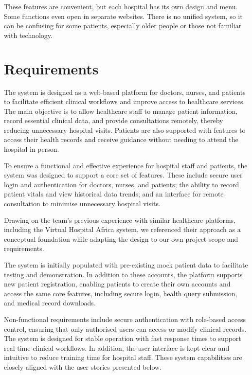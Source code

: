 These features are convenient, but each hospital has its own design and menu. Some functions even open in separate websites. There is no unified system, so it can be confusing for some patients, especially older people or those not familiar with technology.


\clearpage


\clearpage
\section{Requirements}
\label{sec:requirements}

The system is designed as a web-based platform for doctors, nurses, and patients to facilitate efficient clinical workflows and improve access to healthcare services. The main objective is to allow healthcare staff to manage patient information, record essential clinical data, and provide consultations remotely, thereby reducing unnecessary hospital visits. Patients are also supported with features to access their health records and receive guidance without needing to attend the hospital in person.

To ensure a functional and effective experience for hospital staff and patients, the system was designed to support a core set of features. These include secure user login and authentication for doctors, nurses, and patients; the ability to record patient vitals and view historical data trends; and an interface for remote consultation to minimise unnecessary hospital visits.

Drawing on the team’s previous experience with similar healthcare platforms, including the Virtual Hospital Africa system, we referenced their approach as a conceptual foundation while adapting the design to our own project scope and requirements.

The system is initially populated with pre-existing mock patient data to facilitate testing and demonstration. In addition to these accounts, the platform supports new patient registration, enabling patients to create their own accounts and access the same core features, including secure login, health query submission, and medical record downloads.

Non-functional requirements include secure authentication with role-based access control, ensuring that only authorised users can access or modify clinical records. The system is designed for stable operation with fast response times to support real-time clinical workflows. In addition, the user interface is kept clear and intuitive to reduce training time for hospital staff. These system capabilities are closely aligned with the user stories
presented below.

